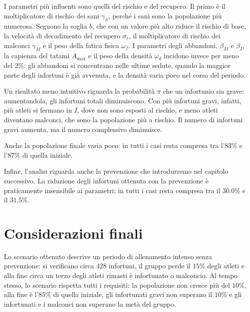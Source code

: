 I parametri più influenti sono quelli del rischio e del recupero. Il primo è il moltiplicatore di rischio dei sani $\gamma_S$, perché i sani sono la popolazione più numerosa. Seguono la soglia $b$, che con un valore più alto riduce il rischio di base, la velocità di decadimento del recupero $\sigma_r$, il moltiplicatore di rischio dei malconci $\gamma_M$ e il peso della fatica fisica $\omega_f$. I parametri degli abbandoni, $\beta_M$ e $\beta_I$, la capienza del tatami $A_{\max}$ e il peso della densità $\omega_d$ incidono invece per meno del $2\%$: gli abbandoni si concentrano nelle ultime sedute, quando la maggior parte degli infortuni è già avvenuta, e la densità varia poco nel corso del periodo. \par

Un risultato meno intuitivo riguarda la probabilità $\pi$ che un infortunio sia grave: aumentandola, gli infortuni totali diminuiscono. Con più infortuni gravi, infatti, più atleti si fermano in $I$, dove non sono esposti al rischio, e meno atleti diventano malconci, che sono la popolazione più a rischio. Il numero di infortuni gravi aumenta, ma il numero complessivo diminuisce. \par

Anche la popolazione finale varia poco: in tutti i casi resta compresa tra l'$83\%$ e l'$87\%$ di quella iniziale. \par

Infine, l'analisi riguarda anche la prevenzione che introdurremo nel capitolo successivo. La riduzione degli infortuni ottenuta con la prevenzione è praticamente insensibile ai parametri: in tutti i casi resta compresa tra il $30.0\%$ e il $31.5\%$.

\section{Considerazioni finali}

Lo scenario ottenuto descrive un periodo di allenamento intenso senza prevenzione: si verificano circa $428$ infortuni, il gruppo perde il $15\%$ degli atleti e alla fine circa un terzo degli atleti rimasti è infortunato o malconcio. Al tempo stesso, lo scenario rispetta tutti i requisiti: la popolazione non cresce più del $10\%$, alla fine è l'$85\%$ di quella iniziale, gli infortunati gravi non superano il $10\%$ e gli infortunati e i malconci non superano la metà del gruppo. \par

